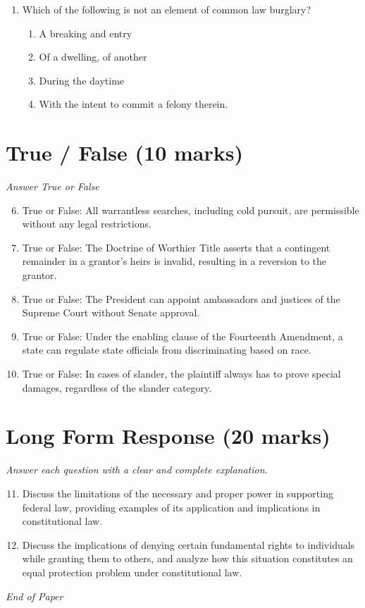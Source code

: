 \documentclass[12pt]{article}
\begin{document}
\begin{enumerate}[label=\arabic*.]
\begin{enumerate}[label=(\alph*)]
    \item not hearsay.
    \item hearsay, but admissible as an admission.
    \item hearsay, but admissible as a dying declaration.
    \item hearsay not within any recognized exception.
\end{enumerate}
\item Which of the following is not an element of common law burglary?
\begin{enumerate}[label=(\alph*)]
    \item A breaking and entry
    \item Of a dwelling, of another
    \item During the daytime
    \item With the intent to commit a felony therein.
\end{enumerate}
\end{enumerate}

\section*{True / False (10 marks)}
\textit{Answer True or False}
\begin{enumerate}[label=\arabic*.]
\setcounter{enumi}{5}
\item True or False: All warrantless searches, including cold pursuit, are permissible without any legal restrictions.
\item True or False: The Doctrine of Worthier Title asserts that a contingent remainder in a grantor's heirs is invalid, resulting in a reversion to the grantor.
\item True or False: The President can appoint ambassadors and justices of the Supreme Court without Senate approval.
\item True or False: Under the enabling clause of the Fourteenth Amendment, a state can regulate state officials from discriminating based on race.
\item True or False: In cases of slander, the plaintiff always has to prove special damages, regardless of the slander category.
\end{enumerate}

\section*{Long Form Response (20 marks)}
\textit{Answer each question with a clear and complete explanation.}
\begin{enumerate}[label=\arabic*.]
\setcounter{enumi}{10}
\item Discuss the limitations of the necessary and proper power in supporting federal law, providing examples of its application and implications in constitutional law.
\item Discuss the implications of denying certain fundamental rights to individuals while granting them to others, and analyze how this situation constitutes an equal protection problem under constitutional law.
\end{enumerate}

\vfill
\noindent\textit{End of Paper}
\end{document}
